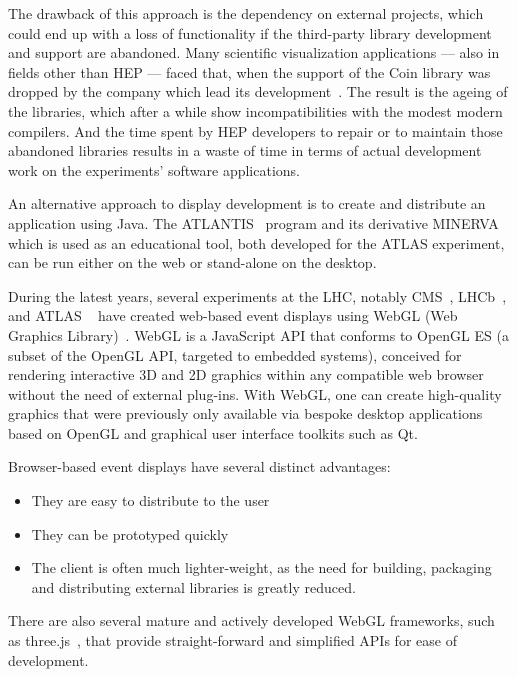 \documentclass[12pt,a4paper]{article}
\begin{document}
The drawback  of this approach is the dependency on external projects, which could end up with a loss of functionality if the
third-party library development and support are abandoned. Many scientific visualization applications --- also in fields other than
HEP --- faced that, when the support of the Coin library was dropped by the company which lead its development~\cite{Coin3D}.
The result is the ageing of the libraries, which after a while show incompatibilities with the modest modern compilers. And the time
spent by HEP developers to repair or to maintain those abandoned libraries results in a waste of time in terms of actual development
work on the experiments’ software applications.

An alternative approach to display development is to create and distribute an application using Java. The ATLANTIS~\cite{ATLASAtlantis}
program and its derivative MINERVA~\cite{ATLASMinerva} which is used as an educational tool, both developed for the ATLAS experiment,
can be run either on the web or stand-alone on the desktop.


During the latest years, several experiments at the LHC, notably CMS~\cite{CMSISpyWebGL}, LHCb~\cite{LHCbOnline2014}, and ATLAS
~\cite{ATLASTada2016, ATLASTracer2015} have created web-based event displays using WebGL (Web Graphics Library)~\cite{WebGL2011}.
WebGL is a JavaScript API that conforms to OpenGL ES (a subset of the OpenGL API, targeted to embedded systems), conceived for
rendering interactive 3D and 2D graphics within any compatible web browser without the need of external plug-ins. With WebGL,
one can create high-quality graphics that were previously only available via bespoke desktop applications based on OpenGL and
graphical user interface toolkits such as Qt.

Browser-based event displays have several distinct advantages:
\begin{itemize}
\item They are easy to distribute to the user
\item They can be prototyped quickly
\item The client is often much lighter-weight, as the need for building, packaging and distributing external libraries is greatly reduced.
\end{itemize}

There are also several mature and actively developed WebGL frameworks, such as three.js~\cite{ThreeJSXXXX}, that provide straight-forward
and simplified APIs for ease of development.
\end{document}
